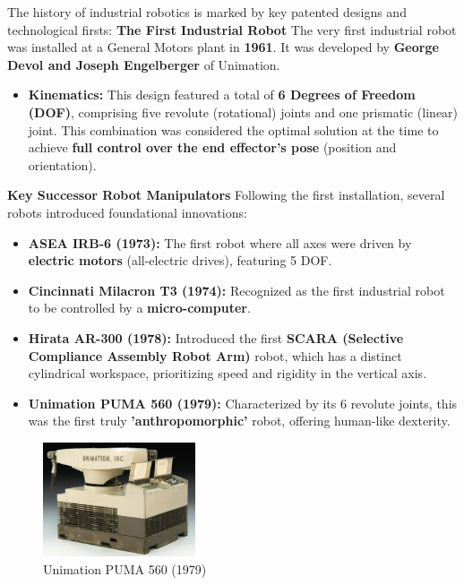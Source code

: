 \documentclass[10pt, letterpaper]{report}
\begin{document}
The history of industrial robotics is marked by key patented designs and technological firsts:
\textbf{The First Industrial Robot}
The very first industrial robot was installed at a General Motors plant in \textbf{1961}. It was developed by \textbf{George Devol and Joseph Engelberger} of Unimation.
\begin{itemize}
    \item \textbf{Kinematics:} This design featured a total of \textbf{6 Degrees of Freedom (DOF)}, comprising five revolute (rotational) joints and one prismatic (linear) joint. This combination was considered the optimal solution at the time to achieve \textbf{full control over the end effector's pose} (position and orientation).
\end{itemize}

\textbf{Key Successor Robot Manipulators}
Following the first installation, several robots introduced foundational innovations:
\begin{itemize}
    \item \textbf{ASEA IRB-6 (1973):} The first robot where all axes were driven by \textbf{electric motors} (all-electric drives), featuring 5 DOF.
    \item \textbf{Cincinnati Milacron T3 (1974):} Recognized as the first industrial robot to be controlled by a \textbf{micro-computer}.
    \item \textbf{Hirata AR-300 (1978):} Introduced the first \textbf{SCARA (Selective Compliance Assembly Robot Arm)} robot, which has a distinct cylindrical workspace, prioritizing speed and rigidity in the vertical axis.
    \item \textbf{Unimation PUMA 560 (1979):} Characterized by its 6 revolute joints, this was the first truly \textbf{'anthropomorphic'} robot, offering human-like dexterity.
\end{itemize}\bigskip

\begin{figure}[h!]
    \centering
    \includegraphics[width=0.4\textwidth ]{images/unimation.jpg} 
    \caption{Unimation PUMA 560 (1979)}
\end{figure}
\end{document}
